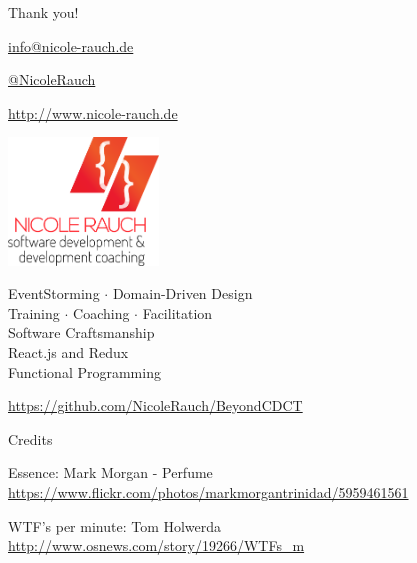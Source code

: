 \begin{frame}{Thank you!}

\vspace{-2em}

\noindent\begin{minipage}[t]{\linewidth}

\begin{minipage}[b]{.58\linewidth}
  \begin{block}{}
    \begin{description}[Twitterxx]
    \item[E-Mail]  \href{mailto:info@nicole-rauch.de}{\textsf{info@nicole-rauch.de}}
    \item[Twitter] \href{http://twitter.com/NicoleRauch}{\textsf{@NicoleRauch}}
    \item[Web] \href{http://www.nicole-rauch.de}{\textsf{http://www.nicole-rauch.de}}
    \end{description}
  \end{block}
\end{minipage}
\hfill
\begin{minipage}[b]{0.38\linewidth}
\includegraphics[width=4cm]{./logos/Nicole.png}
\vspace{.9em}
\end{minipage}

\end{minipage}

\vspace{2em}

\begin{minipage}[t]{\linewidth}

\begin{center}
EventStorming $\cdot$ Domain-Driven Design \\
Training $\cdot$ Coaching $\cdot$ Facilitation \\
Software Craftsmanship \\ 
React.js and Redux  \\
Functional Programming
\end{center}  

\begin{center}
                \url{https://github.com/NicoleRauch/BeyondCDCT}
\end{center}

\end{minipage}

\end{frame}


\begin{frame}{Credits}

Essence: Mark Morgan - Perfume
{\footnotesize \url{https://www.flickr.com/photos/markmorgantrinidad/5959461561}}

WTF's per minute: Tom Holwerda
{\footnotesize \url{http://www.osnews.com/story/19266/WTFs_m}}

\end{frame}
